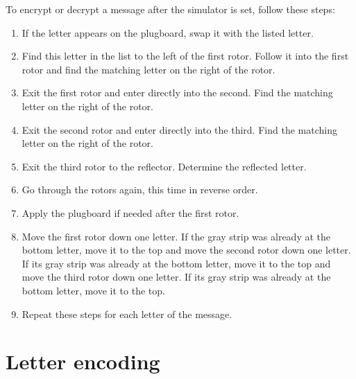 \documentclass{book}
\theoremstyle{plain}
\theoremstyle{definition}
\begin{document}
To encrypt or decrypt a message after the simulator is set, follow these steps:
\begin{enumerate}
\item If the letter appears on the plugboard, swap it with the listed letter.
\item Find this letter in the list to the left of the first rotor. Follow it into the first rotor and find the matching letter on the right of the rotor.
\item Exit the first rotor and enter directly into the second. Find the matching letter on the right of the rotor.
\item Exit the second rotor and enter directly into the third. Find the matching letter on the right of the rotor.
\item Exit the third rotor to the reflector. Determine the reflected letter.
\item Go through the rotors again, this time in reverse order.
\item Apply the plugboard if needed after the first rotor.
\item Move the first rotor down one letter. If the gray strip was already at the bottom letter, move it to the top and move the second rotor down one letter. If its gray strip was already at the bottom letter, move it to the top and move the third rotor down one letter. If its gray strip was already at the bottom letter, move it to the top.
\item Repeat these steps for each letter of the message.
\end{enumerate}



\chapter{Letter encoding}
\label{app:encoding}
\def\arraystretch{1.3}
\end{document}
